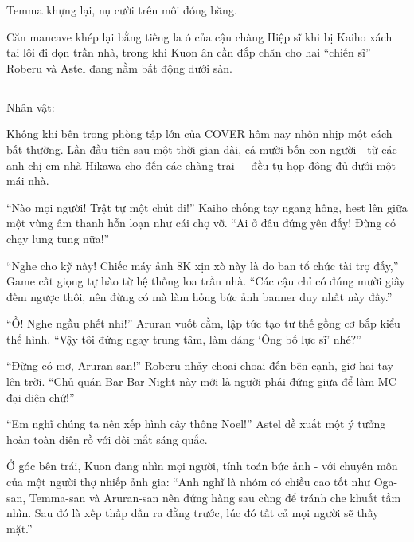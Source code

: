 \documentclass[../main.tex]{subfiles}
\begin{document}
Temma khựng lại, nụ cười trên môi đóng băng.

Căn mancave khép lại bằng tiếng la ó của cậu chàng Hiệp sĩ khi bị Kaiho xách tai lôi đi dọn trần nhà, trong khi Kuon ân cần đắp chăn cho hai ``chiến sĩ'' Roberu và Astel đang nằm bất động dưới sàn.

\newpage

\subsection*{\label{ep-SM1.V}}
\vspace{-4pt}
\begin{center}
  {\caviar\fontsize{12pt}{12pt}\selectfont Nhân vật:               }
\end{center}

Không khí bên trong phòng tập lớn của COVER hôm nay nhộn nhịp một cách bất thường. Lần đầu tiên sau một thời gian dài, cả mười bốn con người - từ các anh chị em nhà Hikawa cho đến các chàng trai \hls\ - đều tụ họp đông đủ dưới một mái nhà.

``Nào mọi người! Trật tự một chút đi!'' Kaiho chống tay ngang hông, hest lên giữa một vùng âm thanh hỗn loạn như cái chợ vỡ. ``Ai ở đâu đứng yên đấy! Đừng có chạy lung tung nữa!''

``Nghe cho kỹ này! Chiếc máy ảnh 8K xịn xò này là do ban tổ chức tài trợ đấy,'' Game cất giọng tự hào từ hệ thống loa trần nhà. ``Các cậu chỉ có đúng mười giây đếm ngược thôi, nên đừng có mà làm hỏng bức ảnh banner duy nhất này đấy.''

``Ồ! Nghe ngầu phết nhỉ!'' Aruran vuốt cằm, lập tức tạo tư thế gồng cơ bắp kiểu thể hình. ``Vậy tôi đứng ngay trung tâm, làm dáng `Ông bố lực sĩ' nhé?''

``Đừng có mơ, Aruran-san!'' Roberu nhảy choai choai đến bên cạnh, giơ hai tay lên trời. ``Chủ quán Bar Bar Night này mới là người phải đứng giữa để làm MC đại diện chứ!''

``Em nghĩ chúng ta nên xếp hình cây thông Noel!'' Astel đề xuất một ý tưởng hoàn toàn điên rồ với đôi mắt sáng quắc.

Ở góc bên trái, Kuon đang nhìn mọi người, tính toán bức ảnh - với chuyên môn của một người thợ nhiếp ảnh gia: ``Anh nghĩ là nhóm có chiều cao tốt như Oga-san, Temma-san và Aruran-san nên đứng hàng sau cùng để tránh che khuất tầm nhìn. Sau đó là xếp thấp dần ra đằng trước, lúc đó tất cả mọi người sẽ thấy mặt.''
\end{document}
